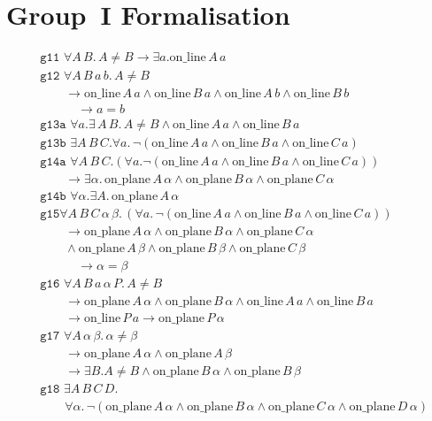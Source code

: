 \documentclass{article}
\newcommand{\online}[2]{\text{on\_line}\,#1\,#2}
\newcommand{\onplane}[2]{\text{on\_plane}\,#1\,#2}
\renewcommand{\implies}{\longrightarrow}
\begin{document}
\section{Group~I Formalisation}\label{app:GroupIFormalisation}
\begin{align*}
&\texttt{g11 }\forall A\,B.\,A \neq B \implies \exists a. \online{A}{a}\\
&\texttt{g12 }\forall A\,B\,a\,b.\,A \neq B\\
&\qquad\implies \online{A}{a}\wedge \online{B}{a}\wedge \online{A}{b}\wedge \online{B}{b}\\
&\quad\qquad\implies a = b\\
&\texttt{g13a }\forall a. \exists\,A\,B.\,A \neq B\wedge \online{A}{a}\wedge \online{B}{a}\\
&\texttt{g13b }\exists A\,B\,C.\forall a.\,\neg(\online{A}{a}\wedge \online{B}{a}\wedge \online{C}{a})\\
&\texttt{g14a }\forall A\,B\,C.(\forall a. \neg(\online{A}{a}\wedge \online{B}{a}\wedge \online{C}{a}))\\
&\qquad\implies \exists\alpha.\,\onplane{A}{\alpha}\wedge \onplane{B}{\alpha}\wedge \onplane{C}{\alpha}\\
&\texttt{g14b }\forall\alpha. \exists A.\,\onplane{A}{\alpha}\\
&\texttt{g15}\forall A\,B\,C\,\alpha\,\beta.\,(\forall a.\, \neg(\online{A}{a}\wedge \online{B}{a}\wedge \online{C}{a}))\\
&\qquad\implies \onplane{A}{\alpha}\wedge \onplane{B}{\alpha}\wedge \onplane{C}{\alpha}\\
&\qquad\wedge \onplane{A}{\beta}\wedge \onplane{B}{\beta}\wedge \onplane{C}{\beta}\\
&\quad\qquad\implies\alpha = \beta\\
&\texttt{g16 }\forall A\,B\,a\,\alpha\,P.\,A \neq B\\
&\qquad\implies \onplane{A}{\alpha}\wedge \onplane{B}{\alpha}\wedge \online{A}{a}\wedge \online{B}{a}\\
&\qquad\implies\online{P}{a}\implies\onplane{P}{\alpha}\\
&\texttt{g17 }\forall A\,\alpha\,\beta.\,\alpha\neq\beta\\
&\qquad\implies\onplane{A}{\alpha}\wedge \onplane{A}{\beta}\\
&\qquad\implies\exists B. A\neq B \wedge \onplane{B}{\alpha}\wedge \onplane{B}{\beta}\\
&\texttt{g18 }\exists A\,B\,C\,D.\\
&\qquad\forall\alpha.\,\neg(\onplane{A}{\alpha}\wedge \onplane{B}{\alpha}\wedge \onplane{C}{\alpha}\wedge \onplane{D}{\alpha})
\end{align*}
\end{document}
